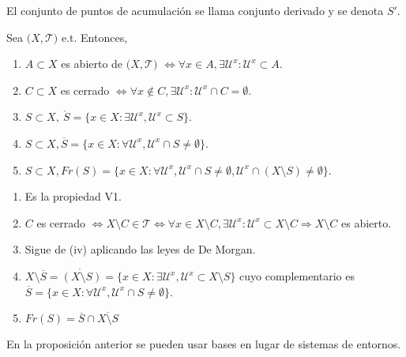\begin{defn}
  El conjunto de puntos de acumulación se llama conjunto derivado y se denota $S'$.
\end{defn}

\begin{prop}
  Sea $\big( X, \mathcal{T} \big)$ e.t. Entonces,
  \begin{enumerate}[label=(\roman*)]
    \item $A \subset X$ es abierto de $\big( X, \mathcal{T} \big)$ $ \Leftrightarrow \forall x \in A, \exists \mathcal{U}^{x}: \mathcal{U}^{x} \subset A$.
    \item $C \subset X$ es cerrado $\Leftrightarrow \forall x  \not \in C, \exists \mathcal{U}^{x}: \mathcal{U}^{x} \cap C = \emptyset$.
    \item $S  \subset X, \ \mathring{S} = \{ x \in X : \exists \mathcal{U}^{x}, \mathcal{U}^{x} \subset S \}$.
    \item $S \subset X, \overline{S} = \{ x \in X : \forall \mathcal{U}^{x}, \mathcal{U}^{x} \cap S \neq \emptyset \}$.
    \item $S \subset X, Fr(S) = \{ x \in X : \forall \mathcal{U}^{x}, \mathcal{U}^{x} \cap S \neq \emptyset, \mathcal{U}^{x} \cap (X \setminus S) \neq \emptyset\}$. 
  \end{enumerate}
\end{prop}

\begin{dem}
  \begin{enumerate}[label=(\roman*)]
    \item Es la propiedad V1.
    \item $C$ es cerrado $\Leftrightarrow X \setminus C \in \mathcal{T} \Leftrightarrow \forall x \in X \setminus C, \exists \mathcal{U}^{x}: \mathcal{U}^{x} \subset X \setminus C \Rightarrow X \setminus C$ es abierto.
    \item Sigue de (iv) aplicando las leyes de De Morgan.
    \item $X \setminus \overline{S} = \mathring{(X \setminus S)} = \{ x \in X : \exists \mathcal{U}^{x}, \mathcal{U}^{x} \subset X \setminus S\}$ cuyo complementario es $\overline{S} = \{ x \in X : \forall \mathcal{U}^{x}, \mathcal{U}^{x} \cap S \neq \emptyset \}$.
    \item $Fr(S) = \overline{S} \cap \overline{X \setminus S}$
  \end{enumerate}
\end{dem}

\begin{obs}
  En la proposición anterior se pueden usar bases en lugar de sistemas de entornos.
\end{obs}

